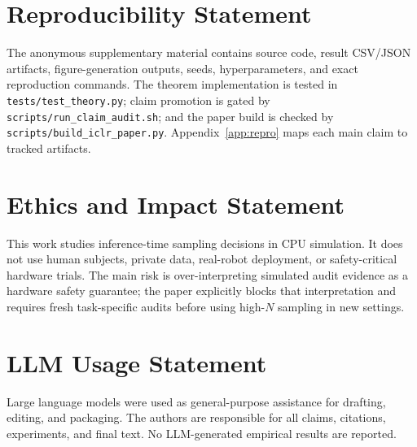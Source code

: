 \documentclass{article}
\begin{document}
\section*{Reproducibility Statement}
The anonymous supplementary material contains source code, result CSV/JSON artifacts, figure-generation outputs, seeds, hyperparameters, and exact reproduction commands. The theorem implementation is tested in \texttt{tests/test\_theory.py}; claim promotion is gated by \texttt{scripts/run\_claim\_audit.sh}; and the paper build is checked by \texttt{scripts/build\_iclr\_paper.py}. Appendix~\ref{app:repro} maps each main claim to tracked artifacts.

\section*{Ethics and Impact Statement}
This work studies inference-time sampling decisions in CPU simulation. It does not use human subjects, private data, real-robot deployment, or safety-critical hardware trials. The main risk is over-interpreting simulated audit evidence as a hardware safety guarantee; the paper explicitly blocks that interpretation and requires fresh task-specific audits before using high-$N$ sampling in new settings.

\section*{LLM Usage Statement}
Large language models were used as general-purpose assistance for drafting, editing, and packaging. The authors are responsible for all claims, citations, experiments, and final text. No LLM-generated empirical results are reported.

\label{maintextend}



\appendix

\end{document}
